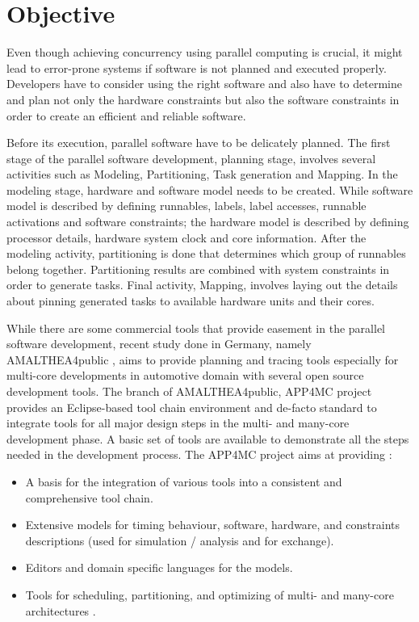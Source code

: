 \section{Objective}
Even though achieving concurrency using parallel computing is crucial, it might lead to error-prone systems if software is not planned and executed properly. Developers have to consider using the right software and also have to determine and plan not only the hardware constraints but also the software constraints in order to create an efficient and reliable software.

Before its execution, parallel software have to be delicately planned. The first stage of the parallel software development, planning stage, involves several activities such as Modeling, Partitioning, Task generation and Mapping. In the modeling stage, hardware and software model needs to be created. While software model is described by defining runnables, labels, label accesses, runnable activations and software constraints; the hardware model is described by defining processor details, hardware system clock and core information. After the modeling activity, partitioning is done that determines which group of runnables belong together. Partitioning results are combined with system constraints in order to generate tasks. Final activity, Mapping, involves laying out the details about pinning generated tasks to available hardware units and their cores.

While there are some commercial tools that provide easement in the parallel software development, recent study done in Germany, namely AMALTHEA4public \cite{ICPDSSE} \cite{amalthea4publicweb}, aims to provide planning and tracing tools especially for multi-core developments in automotive domain with several open source development tools. The branch of AMALTHEA4public, APP4MC project \cite{app4mcproposaleclipse} provides an Eclipse-based tool chain environment and de-facto standard to integrate tools for all major design steps in the multi- and many-core development phase. A basic set of tools are available to demonstrate all the steps needed in the development process. The APP4MC project aims at providing \cite{app4mcproposaleclipse}:

\begin{itemize}
	\item A basis for the integration of various tools into a consistent and comprehensive tool chain.
	\item Extensive models for timing behaviour, software, hardware, and constraints descriptions (used for simulation / analysis and for exchange).
	\item Editors and domain specific languages for the models.
	\item Tools for scheduling, partitioning, and optimizing of multi- and many-core architectures \cite{app4mcproposaleclipse}.
\end{itemize}

